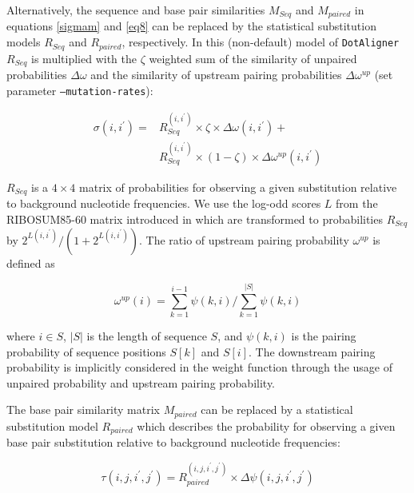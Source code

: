 \documentclass{bmcart}
\newcommand\dotaligner{\texttt{DotAligner}}
\begin{document}
Alternatively, the sequence and base pair similarities $M_{Seq}$ and $M_{paired}$ in equations \ref{sigmam} and \ref{eq8} can be replaced by the statistical substitution models $R_{Seq}$ and $R_{paired}$, respectively. In this (non-default) model of \dotaligner{} $R_{Seq}$ is multiplied with the $\zeta$
weighted sum of the similarity of unpaired probabilities $\Delta \omega$ and the similarity of upstream
pairing probabilities $\Delta \omega^{up}$ (set parameter \texttt{--mutation-rates}):

\begin{equation}\label{sigmar}
\begin{aligned}
	\sigma(i,i^\prime) ={} & R_{Seq}^{(i,i^\prime)} \times \zeta \times \Delta \omega(i,i^\prime) +  \\
			       & R_{Seq}^{(i,i^\prime)} \times (1-\zeta) \times
	\Delta \omega^{up}(i,i^\prime)
\end{aligned}
\end{equation}

\noindent  $R_{Seq}$ is a $4\times4$ matrix of probabilities for observing
a given substitution relative to background nucleotide frequencies. We use the
log-odd scores $L$ from the RIBOSUM85-60 matrix introduced in
\cite{Klein14499004} which are transformed to probabilities $R_{Seq}$ by
$2^{L(i,i^\prime)} / (1 + 2^{L(i,i^\prime)})$. The ratio of upstream pairing probability
$\omega^{up}$ is defined as

\begin{equation}\label{eq5}
	\omega^{up}(i) = \sum_{k=1}^{i-1} \psi(k,i) /
	\sum_{k=1}^{|S|} \psi(k,i)
\end{equation}

\noindent where $i \in S$, $|S|$ is the length of sequence $S$, and $\psi(k,i)$ is the
pairing probability of sequence positions $S[k]$ and $S[i]$. The downstream
pairing probability is implicitly considered in the weight function through the
usage of unpaired probability and upstream pairing probability.

\noindent The base pair similarity matrix
$M_{paired}$ can be replaced by a statistical substitution model $R_{paired}$
which describes the probability for observing a given base pair substitution
relative to background nucleotide frequencies:

\begin{equation}\label{eq10}
	\tau(i,j,i^\prime,j^\prime) = R_{paired}^{(i,j,i^\prime,j^\prime)}
\times \Delta \psi(i,j,i^\prime,j^\prime)
\end{equation}
\end{document}
